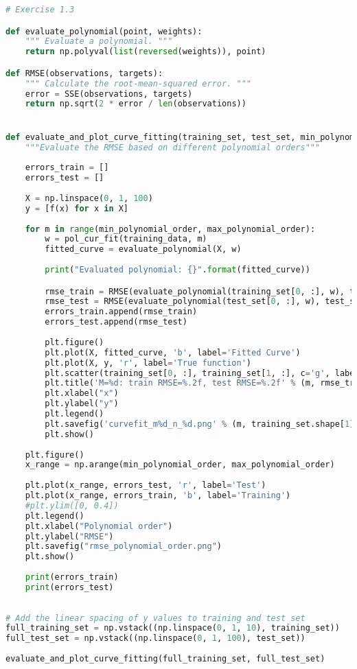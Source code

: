 \documentclass[a4paper]{article}
\begin{document}
\begin{lstlisting}[language=Python]
# Exercise 1.3

def evaluate_polynomial(point, weights):
    """ Evaluate a polynomial. """
    return np.polyval(list(reversed(weights)), point)

def RMSE(observations, targets):
    """ Calculate the root-mean-squared error. """
    error = SSE(observations, targets)
    return np.sqrt(2 * error / len(observations))


def evaluate_and_plot_curve_fitting(training_set, test_set, min_polynomial_order = 0, max_polynomial_order = 10):
    """Evaluate the RMSE based on different polynomial orders"""
    
    errors_train = []
    errors_test = []
    
    X = np.linspace(0, 1, 100)
    y = [f(x) for x in X]
    
    for m in range(min_polynomial_order, max_polynomial_order):
        w = pol_cur_fit(training_data, m)
        fitted_curve = evaluate_polynomial(X, w)
        
        print("Evaluated polynomial: {}".format(fitted_curve))

        rmse_train = RMSE(evaluate_polynomial(training_set[0, :], w), training_set[1, :])
        rmse_test = RMSE(evaluate_polynomial(test_set[0, :], w), test_set[1, :])
        errors_train.append(rmse_train)
        errors_test.append(rmse_test)
        
        plt.figure()
        plt.plot(X, fitted_curve, 'b', label='Fitted Curve')
        plt.plot(X, y, 'r', label='True function')
        plt.scatter(training_set[0, :], training_set[1, :], c='g', label='Noisy observations')
        plt.title('M=%d: train RMSE=%.2f, test RMSE=%.2f' % (m, rmse_train, rmse_test))
        plt.xlabel("x")
        plt.ylabel("y")
        plt.legend()
        plt.savefig('curvefit_m%d_n_%d.png' % (m, training_set.shape[1]))
        plt.show()
        
    plt.figure()    
    x_range = np.arange(min_polynomial_order, max_polynomial_order)
        
    plt.plot(x_range, errors_test, 'r', label='Test')
    plt.plot(x_range, errors_train, 'b', label='Training')
    #plt.ylim([0, 0.4])
    plt.legend()
    plt.xlabel("Polynomial order")
    plt.ylabel("RMSE")
    plt.savefig("rmse_polynomial_order.png")
    plt.show()
    
    print(errors_train)
    print(errors_test)
  
        
# Add the linear spacing of y values to training and test set
full_training_set = np.vstack((np.linspace(0, 1, 10), training_set))
full_test_set = np.vstack((np.linspace(0, 1, 100), test_set))        
        
evaluate_and_plot_curve_fitting(full_training_set, full_test_set)
\end{lstlisting}
\end{document}
